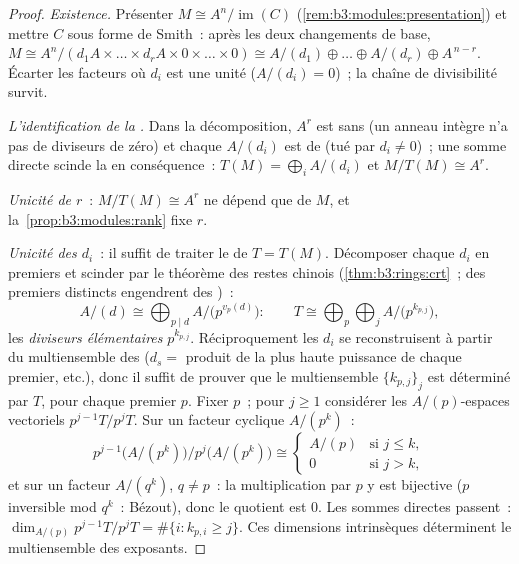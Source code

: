 \begin{proof}
\emph{Existence.} Présenter $M \cong A^n/\operatorname{im}(C)$
(\cref{rem:b3:modules:presentation}) et mettre $C$ sous forme de
Smith~: après les deux changements de base, $M \cong A^n /
(d_1A \times \dots \times d_rA \times 0 \times \dots \times 0)
\cong A/(d_1) \oplus \dots \oplus A/(d_r) \oplus A^{\,n - r}$.
Écarter les facteurs où $d_i$ est une unité ($A/(d_i) = 0$)~; la
chaîne de divisibilité survit.

\emph{L'identification de la .} Dans la décomposition,
$A^r$ est sans  (un anneau intègre n'a pas de diviseurs
de zéro) et chaque $A/(d_i)$ est de  (tué par $d_i \ne
0$)~; une somme directe scinde la  en conséquence~:
$T(M) = \bigoplus_i A/(d_i)$ et $M/T(M) \cong A^r$.

\emph{Unicité de $r$}~: $M/T(M) \cong A^r$ ne dépend que de $M$,
et la~\cref{prop:b3:modules:rank} fixe $r$.

\emph{Unicité des $d_i$}~: il suffit de traiter le  de
 $T = T(M)$. Décomposer chaque $d_i$ en premiers et
scinder par le théorème des restes chinois
(\cref{thm:b3:rings:crt}~; des premiers distincts engendrent des
)~:
\[
A/(d) \cong \bigoplus_{p \mid d} A/\bigl(p^{v_p(d)}\bigr):
\qquad
T \cong \bigoplus_{p} \bigoplus_{j} A/\bigl(p^{k_{p,j}}\bigr),
\]
les \emph{diviseurs élémentaires}
$p^{k_{p,j}}$. Réciproquement les $d_i$ se reconstruisent à
partir du multiensemble des  ($d_s =$
produit de la plus haute puissance de chaque premier, etc.),
donc il suffit de prouver que le multiensemble $\{k_{p,j}\}_j$
est déterminé par $T$, pour chaque premier $p$. Fixer $p$~; pour
$j \geq 1$ considérer les $A/(p)$-espaces vectoriels
$p^{j-1}T/p^jT$. Sur un facteur cyclique $A/(p^k)$~:
\[
p^{j-1}\bigl(A/(p^k)\bigr)\big/p^{j}\bigl(A/(p^k)\bigr)
\cong
\begin{cases}
A/(p) & \text{si } j \leq k,\\
0 & \text{si } j > k,
\end{cases}
\]
et sur un facteur $A/(q^k)$, $q \neq p$~: la multiplication par
$p$ y est bijective ($p$ inversible mod $q^k$~: Bézout), donc le
quotient est $0$. Les sommes directes passent~:
$\dim_{A/(p)} p^{j-1}T/p^jT = \#\{i : k_{p,i} \geq j\}$. Ces
dimensions intrinsèques déterminent le multiensemble des
exposants.
\end{proof}

